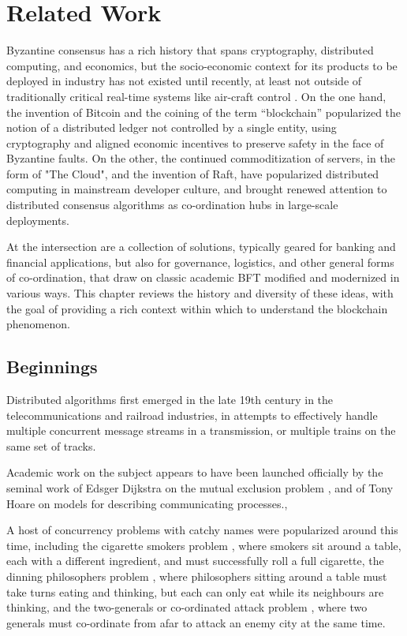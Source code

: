 \chapter{Related Work}
\label{ch:related}

Byzantine consensus has a rich history that spans cryptography, distributed computing, and economics,
but the socio-economic context for its products to be deployed in industry has not existed until recently,
at least not outside of traditionally critical real-time systems like air-craft control \cite{draper_lab}.
On the one hand, the invention of Bitcoin and the coining of the term ``blockchain'' popularized the notion
of a distributed ledger not controlled by a single entity, using cryptography and aligned economic incentives to 
preserve safety in the face of Byzantine faults.
On the other, the continued commoditization of servers, in the form of "The Cloud", and the invention of Raft, 
have popularized distributed computing in mainstream developer culture, 
and brought renewed attention to distributed consensus algorithms as co-ordination hubs in large-scale deployments. 

At the intersection are a collection of solutions, typically geared for banking and financial applications,
but also for governance, logistics, and other general forms of co-ordination, 
that draw on classic academic BFT modified and modernized in various ways.
This chapter reviews the history and diversity of these ideas, with the goal of providing a rich context within which to 
understand the blockchain phenomenon.

\section{Beginnings}

Distributed algorithms first emerged in the late 19th century in the telecommunications and railroad industries,
in attempts to effectively handle multiple concurrent message streams in a transmission, 
or multiple trains on the same set of tracks.

Academic work on the subject appears to have been launched officially by the seminal work
of Edsger Dijkstra on the mutual exclusion problem \cite{mutex}, and of Tony Hoare on models for describing communicating processes.\cite{csp}, 

A host of concurrency problems with catchy names were popularized around this time,
including the cigarette smokers problem \cite{cigarette_smokers}, where smokers sit around a table, 
each with a different ingredient, and must successfully roll a full cigarette,
the dinning philosophers problem \cite{dining_philosophers},
where philosophers sitting around a table must take turns eating and thinking,
but each can only eat while its neighbours are thinking,
and the two-generals or co-ordinated attack problem \cite{gettier},
where two generals must co-ordinate from afar to attack an enemy city at the same time.


